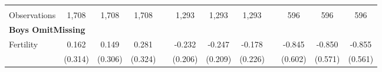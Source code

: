 \begin{landscape}
\begin{table}[htpb!]
\begin{center}
\begin{tabular}{lcccp{2mm}cccp{2mm}ccc}
\begin{footnotesize}\end{footnotesize}&\begin{footnotesize}\end{footnotesize}&\begin{footnotesize}\end{footnotesize}&\begin{footnotesize}\end{footnotesize}&\begin{footnotesize}\end{footnotesize}&\begin{footnotesize}\end{footnotesize}&\begin{footnotesize}\end{footnotesize}&\begin{footnotesize}\end{footnotesize}&\begin{footnotesize}\end{footnotesize}&\begin{footnotesize}\end{footnotesize}&\begin{footnotesize}\end{footnotesize}&\begin{footnotesize}\end{footnotesize}\\Observations&1,708&1,708&1,708&&1,293&1,293&1,293&&596&596&596\\
\multicolumn{12}{l}{\textbf{Boys OmitMissing}}\\ 
Fertility&0.162&0.149&0.281&&-0.232&-0.247&-0.178&&-0.845&-0.850&-0.855\\
&(0.314)&(0.306)&(0.324)&&(0.206)&(0.209)&(0.226)&&(0.602)&(0.571)&(0.561)\\

\end{tabular}
\end{center}
\end{table}
\end{landscape}
